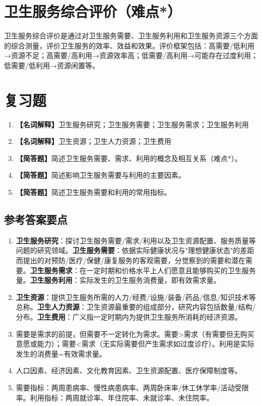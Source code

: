 \section{卫生服务综合评价（难点*）}

\begin{defbox}
卫生服务综合评价是通过对卫生服务需要、卫生服务利用和卫生服务资源三个方面的综合测量，评价卫生服务的效率、效益和效果。评价框架包括：高需要/低利用→资源不足；高需要/高利用→资源效率高；低需要/高利用→可能存在过度利用；低需要/低利用→资源闲置等。
\end{defbox}

\section{复习题}

\begin{enumerate}[leftmargin=*, itemsep=8pt]
    \item \textbf{【名词解释】}卫生服务研究；卫生服务需要；卫生服务需求；卫生服务利用
    \item \textbf{【名词解释】}卫生资源；卫生人力资源；卫生费用
    \item \textbf{【简答题】}简述卫生服务需要、需求、利用的概念及相互关系（难点*）。
    \item \textbf{【简答题】}简述影响卫生服务需要与利用的主要因素。
    \item \textbf{【简答题】}简述卫生服务需要和利用的常用指标。
\end{enumerate}

\subsection*{参考答案要点}

\begin{enumerate}[leftmargin=*, itemsep=5pt]
    \item \textbf{卫生服务研究}：探讨卫生服务需要/需求/利用以及卫生资源配置、服务质量等问题的研究领域。\textbf{卫生服务需要}：依据实际健康状况与"理想健康状态"的差距而提出的对预防/医疗/保健/康复服务的客观需要，分觉察到的需要和潜在需要。\textbf{卫生服务需求}：在一定时期和价格水平上人们愿意且能够购买的卫生服务量。\textbf{卫生服务利用}：实际发生的卫生服务消费量，即有效需求量。
    \item \textbf{卫生资源}：提供卫生服务所需的人力/经费/设施/装备/药品/信息/知识技术等总称。\textbf{卫生人力资源}：卫生资源最重要的组成部分，研究内容包括数量/结构/分布。\textbf{卫生费用}：广义指一定时期内为提供卫生服务所消耗的经济资源。
    \item 需要是需求的前提，但需要不一定转化为需求。需要>需求（有需要但无购买意愿或能力）；需要<需求（无实际需要但产生需求如过度诊疗）。利用是实际发生的消费量=有效需求量。
    \item 人口因素、经济因素、文化教育因素、卫生资源配置、医疗保障制度等。
    \item 需要指标：两周患病率、慢性病患病率、两周卧床率/休工休学率/活动受限率。利用指标：两周就诊率、年住院率、未就诊率、未住院率。
\end{enumerate}

\newpage
